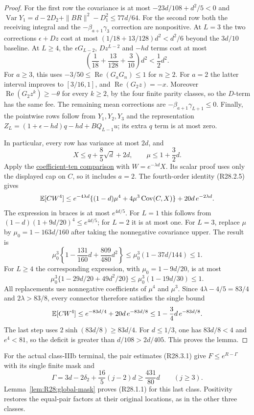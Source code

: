 \begin{proof}
For the first row the covariance is at most
\(-23d/108+d^2/5<0\) and
\(\operatorname{Var}Y_1=d-2D_2+\|BR\|^2-D_1^2\le77d/64\).
For the second row both the receiving integral and the
\(-\beta_{a+1}\gamma_3\) correction are nonpositive.
At \(L=3\) the two corrections \(\epsilon+Dz\) cost at most
\((1/18+13/128)d^2<d^2/6\) beyond the \(3d/10\) baseline.
At \(L\ge4\), the \(\epsilon G_{L-2}\), \(Dz^{L-2}\) and
\(-hd\) terms cost at most
\[
 \left(\frac1{18}+\frac{13}{128}+\frac3{10}\right)d^2
 <\frac12d^2.
\]
For \(a\ge3\), this uses
\(-3/50\le\operatorname{Re}(G_aG_n)\le1\) for \(n\ge2\).
For \(a=2\) the latter interval improves to \([3/16,1]\), and
\(\operatorname{Re}(G_2z)=-x\).
Moreover \(\operatorname{Re}(G_2z^k)\ge-\theta\) for every
\(k\ge2\), by the four finite parity classes, so the \(D\)-term
has the same fee.
The remaining mean corrections are
\(-\beta_{a+1}\gamma_{L+1}\le0\).
Finally, the pointwise rows follow from \(Y_1,Y_2,Y_3\)
and the representation
\(Z_L=(1+\epsilon-hd)q-hd+BQ_{L-1}u\);
its extra \(q\) term is at most zero.

In particular, every row has variance at most \(2d\), and
\[
 X\le q+\frac85\sqrt d+2d,\qquad \mu\le1+\frac32d.
\]
Apply the \hyperref[part:R25:scaled-curvature]{coefficient-ten
comparison} with \(W=e^{-\lambda d}X\).
Its scalar proof uses only the displayed cap on \(C\), so it
includes \(a=2\).
The fourth-order identity (R28.2.5) gives
\[
 \mathbb E[CW^4]\le e^{-4\lambda d}
 \{(1-d)\mu^4+4\mu^3\operatorname{Cov}(C,X)\}
 +20d\,e^{-2\lambda d}.
\]
The expression in braces is at most \(e^{4d/5}\).
For \(L=1\) this follows from
\((1-d)(1+9d/20)^4\le e^{4d/5}\); for \(L=2\) it is at most one.
For \(L=3\), replace \(\mu\) by \(\mu_0=1-163d/160\)
after taking the nonnegative covariance upper. The result is
\[
 \mu_0^3\left\{1-\frac{131}{160}d+\frac{809}{480}d^2\right\}
 \le\mu_0^3(1-37d/144)\le1.
\]
For \(L\ge4\) the corresponding expression, with
\(\mu_0=1-9d/20\), is at most
\[
 \mu_0^3\{1-29d/20+49d^2/20\}
 \le\mu_0^3(1-19d/30)\le1.
\]
All replacements use nonnegative coefficients of
\(\mu^4\) and \(\mu^3\).
Since \(4\lambda-4/5=83/4\) and \(2\lambda>83/8\),
every connector therefore satisfies the single bound
\[
 \mathbb E[CW^4]\le e^{-83d/4}+20d\,e^{-83d/8}
 \le1-\frac34d\,e^{-83d/8}.
\]
The last step uses \(2\sinh(83d/8)\ge83d/4\).
For \(d\le1/3\), one has \(83d/8<4\) and \(e^4<81\),
so the deficit is greater than \(d/108>2d/405\).
This proves the lemma.
\end{proof}

For the actual class-IIIb terminal, the pair estimates (R28.3.1)
give \(F\le e^{R-\Gamma}\) with its single finite mask and
\[
 \Gamma=3d-2\delta_2+\frac{16}{5}(j-2)d
 \ge\frac{431}{80}d\qquad(j\ge3).
\]
Lemma~\ref{lem:R28:global-mask} proves (R28.1.1) for this last
class. Positivity restores the equal-pair factors at their
original locations, as in the other three classes.
